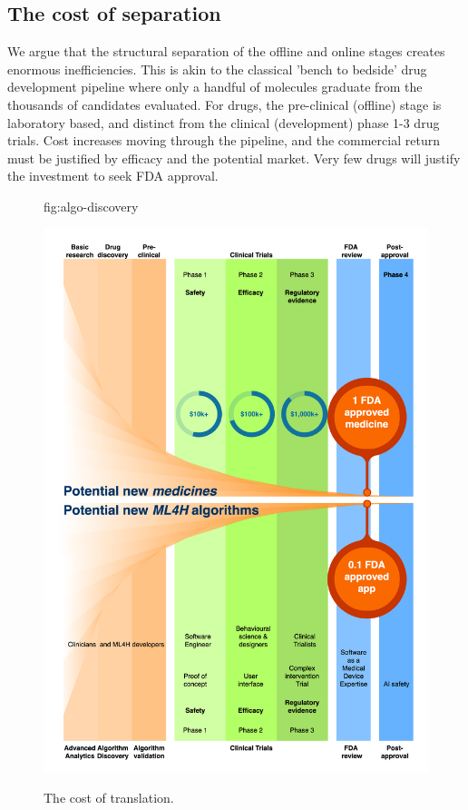 \documentclass[pmlr,twocolumn,10pt]{jmlr} %
\begin{document}
\subsection{The cost of separation}

We argue that the structural separation of the offline and online stages creates enormous inefficiencies.\citep{vaitla2020a} This is akin to the classical 'bench to bedside' drug development pipeline where only a handful of molecules graduate from the thousands of candidates evaluated. For drugs, the pre-clinical (offline) stage is laboratory based, and distinct from the clinical (development) phase 1-3 drug trials. Cost increases moving through the pipeline, and the commercial return must be justified by efficacy and the potential market. Very few drugs will justify the investment to seek FDA approval. 

\begin{figure}[t]
\floatconts
  {fig:algo-discovery}
  {\caption{The cost of translation.}}
 {\includegraphics[width=1.0\linewidth]{images/emap-summary-funnel.png}}

\end{figure}
\end{document}

